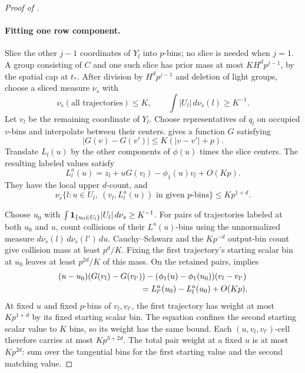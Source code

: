 \begin{proof}[Proof of ]
\paragraph{Fitting one row component.}
Slice the other \(j-1\) coordinates of \(Y_l\) into \(p\)-bins; no slice
is needed when \(j=1\).
A group consisting of \(C\) and one such slice has prior mass at most
\(KH^dp^{j-1}\), by the spatial cap at \(t_*\).
After division by \(H^dp^{j-1}\) and deletion of light groups, choose a
sliced measure \(\nu_s\) with
\[
 \nu_s(\text{all trajectories})\le K,\qquad
 \int|U_l|\,d\nu_s(l)\ge K^{-1}.
\]
Let \(v_l\) be the remaining coordinate of \(Y_l\).
Choose representatives of \(q_l\) on occupied \(v\)-bins and interpolate
between their centers.   gives a function
\(G\) satisfying
\[
 |G(v)-G(v')|\le K(|v-v'|+p).
\]
Translate \(L_l(u)\) by the other components of \(\phi(u)\) times the
slice centers.  The resulting labeled values satisfy
\begin{equation}\label{a04:sliced-model}
 L_l^a(u)=z_l+uG(v_l)-\phi_1(u)v_l+O(Kp).
\end{equation}
They have the local upper \(d\)-count, and
\begin{equation}\label{a04:sliced-cap}
 \nu_s\{l:u\in U_l,\ (v_l,L_l^a(u))
             \text{ in given }p\text{-bins}\}\le Kp^{1+d}.
\end{equation}

Choose \(u_0\) with
\(\int\mathbf 1_{\{u_0\in U_l\}}|U_l|\,d\nu_s\ge K^{-1}\).
For pairs of trajectories labeled at both \(u_0\) and \(u\), count
collisions of their \(L^a(u)\)-bins using the unnormalized measure
\(d\nu_s(l)\,d\nu_s(l')\,du\).
Cauchy--Schwarz and the \(Kp^{-d}\) output-bin count give collision
mass at least \(p^d/K\).
Fixing the first trajectory's starting scalar bin at \(u_0\) leaves
at least \(p^{2d}/K\) of this mass.
On the retained pairs,  implies
\begin{align}
 &(u-u_0)(G(v_l)-G(v_{l'}))
       -(\phi_1(u)-\phi_1(u_0))(v_l-v_{l'})\notag\\
 &\hspace{35mm}=L_{l'}^a(u_0)-L_l^a(u_0)+O(Kp).
 \label{a04:collision-dot}
\end{align}
At fixed \(u\) and fixed \(p\)-bins of \(v_l,v_{l'}\), the first
trajectory has weight at most \(Kp^{1+d}\) by its fixed starting
scalar bin.  The equation confines the second starting scalar value
to \(K\) bins, so its weight has the same bound.
Each \((u,v_l,v_{l'})\)-cell therefore carries at most \(Kp^{3+2d}\).
The total pair weight at a fixed \(u\) is at most \(Kp^{2d}\):
sum  over the tangential bins for the first
starting value and the second matching value.


\end{proof}
